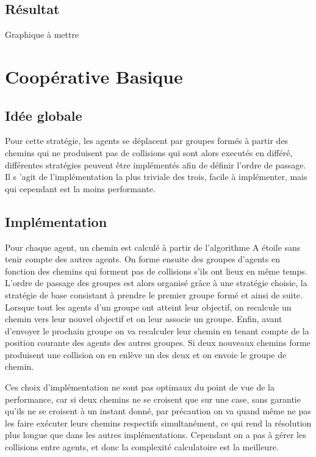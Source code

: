 \documentclass{article}
\begin{document}
			\subsection{Résultat}

			Graphique à mettre
			
		\section{Coopérative Basique}
		
			\subsection{Idée globale}
			Pour cette stratégie, les agents se déplacent par groupes formés à partir des chemins qui ne produisent pas de collisions qui sont alors executés en différé, différentes stratégies peuvent être implémentés afin de définir l'ordre de passage. Il s 'agit de l'implémentation la plus triviale des trois, facile à implémenter, mais qui cependant est la moins performante.
		
			\subsection{Implémentation}
			Pour chaque agent, un chemin est calculé à partir de l'algorithme A étoile sans tenir compte des autres agents. On forme ensuite des groupes d'agents en fonction des chemins qui forment pas de collisions s'ils ont lieux en même temps. L'ordre de passage des groupes est alors organisé grâce à une stratégie choisie, la stratégie de base consistant à prendre le premier groupe formé et ainsi de suite. Lorsque tout les agents d'un groupe ont atteint leur objectif, on recalcule un chemin vers leur nouvel objectif et on leur associe un groupe.
			Enfin, avant d'envoyer le prochain groupe on va recalculer leur chemin en tenant compte de la position courante des agents des autres groupes. Si deux nouveaux chemins forme produisent une collision on en enlève un des deux et on envoie le groupe de chemin.
			
Ces choix d'implémentation ne sont pas optimaux du point de vue de la performance, car si deux chemins ne se croisent que sur une case, sans garantie qu'ils ne se croisent à un instant donné, par précaution on va quand même ne pas les faire exécuter leurs chemins respectifs simultanément, ce qui rend la résolution plus longue que dans les autres implémentations. Cependant on a pas à gérer les collisions entre agents, et donc la complexité calculatoire est la meilleure.
			
\end{document}
